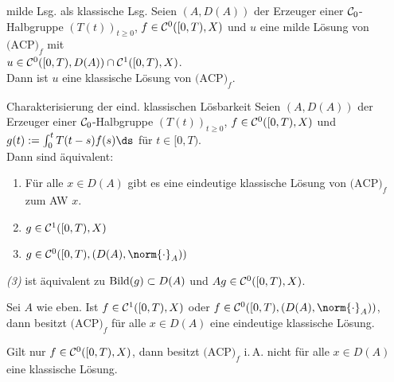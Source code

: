 \linie

\begin{Lemma}{milde Lsg. als klassische Lsg.}
    Seien $(A, D(A))$ der Erzeuger einer $\mathcal{C}_0$-Halbgruppe $(T(t))_{t \ge 0}$,
    $f \in \mathcal{C}^0([0, T), X)$ und $u$ eine milde Lösung von $\text{(ACP)}_f$ mit\\
    $u \in \mathcal{C}^0([0, T), D(A)) \cap \mathcal{C}^1([0, T), X)$.\\
    Dann ist $u$ eine klassische Lösung von $\text{(ACP)}_f$.
\end{Lemma}

\linie

\begin{Satz}{Charakterisierung der eind. klassischen Lösbarkeit}
    Seien $(A, D(A))$ der Erzeuger einer $\mathcal{C}_0$-Halbgruppe $(T(t))_{t \ge 0}$,
    $f \in \mathcal{C}^0([0, T), X)$ und $g(t) := \int_0^t T(t-s)f(s)\ds$ für $t \in [0, T)$.\\
    Dann sind äquivalent:
    \begin{enumerate}
        \item
        Für alle $x \in D(A)$ gibt es eine eindeutige klassische Lösung von $\text{(ACP)}_f$
        zum AW $x$.

        \item
        $g \in \mathcal{C}^1([0, T), X)$

        \item
        $g \in \C^0([0, T), (D(A), \norm{\cdot}_A))$
    \end{enumerate}
\end{Satz}

\begin{Bem}
    \emph{(3)} ist äquivalent zu $\text{Bild}(g) \subset D(A)$ und $Ag \in \mathcal{C}^0([0, T), X)$.
\end{Bem}

\begin{Kor}
    Sei $A$ wie eben.
    Ist $f \in \mathcal{C}^1([0, T), X)$ oder $f \in \C^0([0, T), (D(A), \norm{\cdot}_A))$,
    dann besitzt $\text{(ACP)}_f$ für alle $x \in D(A)$ eine eindeutige klassische Lösung.
\end{Kor}

\begin{Bem}
    Gilt nur $f \in \mathcal{C}^0([0, T), X)$, dann besitzt $\text{(ACP)}_f$ i.\,A. nicht für alle
    $x \in D(A)$ eine klassische Lösung.
\end{Bem}

\linie

